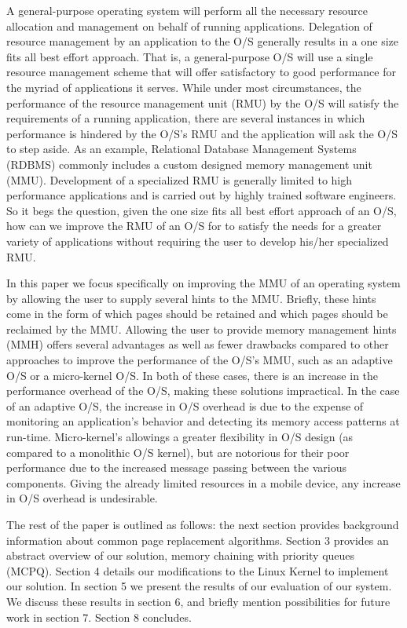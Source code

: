 \documentclass[10pt,a4paper,twocolumn]{article}
\begin{document}
A general-purpose operating system will perform all the necessary resource allocation and management
on behalf of running applications. Delegation of resource management by an application to the O/S
generally results in a one size fits all best effort approach. That is, a general-purpose O/S will
use a single resource management scheme that will offer satisfactory to good performance for the
myriad of applications it serves. While under most circumstances, the performance of the resource
management unit (RMU) by the O/S will satisfy the requirements of a running application, there are
several instances in which performance is hindered by the O/S's RMU and the application will ask the
O/S to step aside. As an example, Relational Database Management Systems (RDBMS) commonly includes a
custom  designed memory management unit (MMU). Development of a specialized RMU is generally limited
to high performance applications and is carried out by highly trained software engineers. So it begs
the question, given the one size fits all best effort approach of an O/S, how can we improve the RMU
of an O/S for to satisfy the needs for a greater variety of applications without requiring the user
to develop his/her specialized RMU. 

In this paper we focus specifically on improving the MMU of an operating system by allowing the user
to supply several hints to the MMU.  Briefly, these hints come in the form of which pages should be
retained and which pages should be reclaimed by the MMU.  Allowing the user to provide memory
management hints (MMH) offers several advantages as well as fewer drawbacks compared to other
approaches to improve the performance of the O/S's MMU, such as an adaptive O/S or a micro-kernel
O/S. In both of these cases, there is an increase in the performance overhead of the O/S, making
these solutions impractical.  In the case of an adaptive O/S, the increase in O/S overhead is due to
the expense of monitoring an application's behavior and detecting its memory access patterns at
run-time. Micro-kernel's allowings a greater flexibility in O/S design (as compared to a monolithic
O/S kernel), but are notorious for their poor performance due to the increased message passing
between the various components. Giving the already limited resources in a mobile device, any
increase in O/S overhead is undesirable.  

The rest of the paper is outlined as follows: the next section provides background information about
common page replacement algorithms. Section 3 provides an abstract overview of our solution, memory
chaining with priority queues (MCPQ). Section 4 details our modifications to the Linux Kernel to
implement our solution. In section 5 we present the results of our evaluation of our system. We
discuss these results in section 6, and briefly mention possibilities for future work in section 7.
Section 8 concludes.
\end{document}
